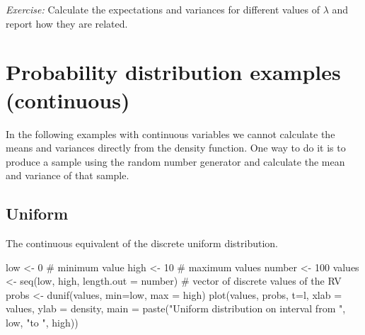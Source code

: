 \documentclass[
  letterpaper,
  DIV=11,
  numbers=noendperiod]{scrreprt}
\newenvironment{Shaded}{\begin{snugshade}}{\end{snugshade}}
\newcommand{\AttributeTok}[1]{\textcolor[rgb]{0.40,0.45,0.13}{#1}}
\newcommand{\CommentTok}[1]{\textcolor[rgb]{0.37,0.37,0.37}{#1}}
\newcommand{\DecValTok}[1]{\textcolor[rgb]{0.68,0.00,0.00}{#1}}
\newcommand{\FunctionTok}[1]{\textcolor[rgb]{0.28,0.35,0.67}{#1}}
\newcommand{\NormalTok}[1]{\textcolor[rgb]{0.00,0.23,0.31}{#1}}
\newcommand{\OtherTok}[1]{\textcolor[rgb]{0.00,0.23,0.31}{#1}}
\newcommand{\StringTok}[1]{\textcolor[rgb]{0.13,0.47,0.30}{#1}}
\begin{document}
\emph{Exercise:} Calculate the expectations and variances for different
values of \(\lambda\) and report how they are related.

\hypertarget{probability-distribution-examples-continuous}{%
\section{Probability distribution examples
(continuous)}\label{probability-distribution-examples-continuous}}

In the following examples with continuous variables we cannot calculate
the means and variances directly from the density function. One way to
do it is to produce a sample using the random number generator and
calculate the mean and variance of that sample.

\hypertarget{uniform-1}{%
\subsection{Uniform}\label{uniform-1}}

The continuous equivalent of the discrete uniform distribution.

\begin{Shaded}
\begin{Highlighting}[]
\NormalTok{low }\OtherTok{\textless{}{-}} \DecValTok{0} \CommentTok{\# minimum value}
\NormalTok{high }\OtherTok{\textless{}{-}} \DecValTok{10} \CommentTok{\# maximum values}
\NormalTok{number }\OtherTok{\textless{}{-}} \DecValTok{100}
\NormalTok{values }\OtherTok{\textless{}{-}} \FunctionTok{seq}\NormalTok{(low, high, }\AttributeTok{length.out =}\NormalTok{ number) }\CommentTok{\# vector of discrete values of the RV}
\NormalTok{probs }\OtherTok{\textless{}{-}} \FunctionTok{dunif}\NormalTok{(values, }\AttributeTok{min=}\NormalTok{low, }\AttributeTok{max =}\NormalTok{ high)}
\FunctionTok{plot}\NormalTok{(values, probs, }\AttributeTok{t=}\StringTok{\textquotesingle{}l\textquotesingle{}}\NormalTok{, }\AttributeTok{xlab =} \StringTok{\textquotesingle{}values\textquotesingle{}}\NormalTok{, }\AttributeTok{ylab =} \StringTok{\textquotesingle{}density\textquotesingle{}}\NormalTok{,}
        \AttributeTok{main =} \FunctionTok{paste}\NormalTok{(}\StringTok{"Uniform distribution on interval from "}\NormalTok{, low, }\StringTok{"to "}\NormalTok{, high))}
\end{Highlighting}
\end{Shaded}
\end{document}
